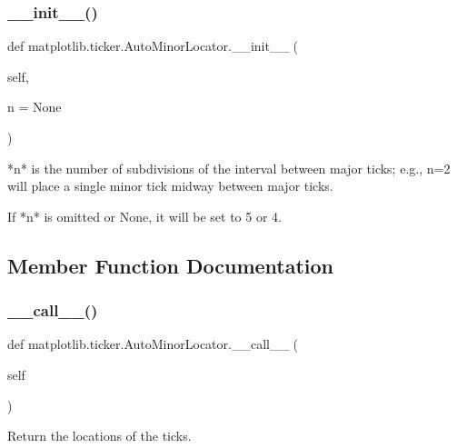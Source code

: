 \subsubsection{\texorpdfstring{\+\_\+\+\_\+init\+\_\+\+\_\+()}{\_\_init\_\_()}}
{\footnotesize\ttfamily def matplotlib.\+ticker.\+Auto\+Minor\+Locator.\+\_\+\+\_\+init\+\_\+\+\_\+ (\begin{DoxyParamCaption}\item[{}]{self,  }\item[{}]{n = {\ttfamily None} }\end{DoxyParamCaption})}

\begin{DoxyVerb}*n* is the number of subdivisions of the interval between
major ticks; e.g., n=2 will place a single minor tick midway
between major ticks.

If *n* is omitted or None, it will be set to 5 or 4.
\end{DoxyVerb}
 

\subsection{Member Function Documentation}
\mbox{\label{classmatplotlib_1_1ticker_1_1AutoMinorLocator_aada705290a86fa27af2012611312d2c5}} 
\subsubsection{\texorpdfstring{\+\_\+\+\_\+call\+\_\+\+\_\+()}{\_\_call\_\_()}}
{\footnotesize\ttfamily def matplotlib.\+ticker.\+Auto\+Minor\+Locator.\+\_\+\+\_\+call\+\_\+\+\_\+ (\begin{DoxyParamCaption}\item[{}]{self }\end{DoxyParamCaption})}

\begin{DoxyVerb}Return the locations of the ticks.\end{DoxyVerb}
 \mbox{\label{classmatplotlib_1_1ticker_1_1AutoMinorLocator_ac7896a11a578475a94768a2550e8f40b}} 
